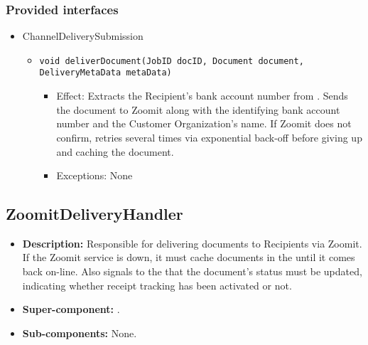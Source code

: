\subsubsection*{Provided interfaces}
\begin{itemize}
    \item ChannelDeliverySubmission
    \begin{itemize}
        \item \texttt{void deliverDocument(JobID docID, Document document, DeliveryMetaData metaData)}
        \begin{itemize}
            \item Effect: Extracts the Recipient's bank account number from . Sends the document to Zoomit along with the identifying bank account number and the Customer Organization's name. If Zoomit does not confirm, retries several times via exponential back-off before giving up and caching the document.
            \item Exceptions: None
        \end{itemize}
    \end{itemize}
\end{itemize}

\subsection{ZoomitDeliveryHandler}
\begin{itemize}
    \item \textbf{Description:} Responsible for delivering documents to Recipients via Zoomit. If the Zoomit service is down, it must cache documents in the  until it comes back on-line. Also signals to the  that the document's status must be updated, indicating whether receipt tracking has been activated or not.
    \item \textbf{Super-component:} .
    \item \textbf{Sub-components:} None.
\end{itemize}

